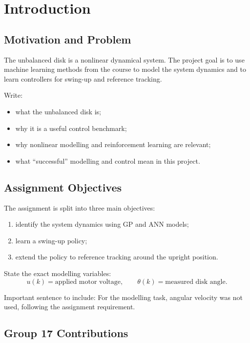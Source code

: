 \documentclass[conference]{IEEEtran}
\begin{document}
\section{Introduction}

\subsection{Motivation and Problem}
The unbalanced disk is a nonlinear dynamical system.
The project goal is to use machine learning methods from the course to model the system dynamics and to learn controllers for swing-up and reference tracking.

Write:
\begin{itemize}
    \item what the unbalanced disk is;
    \item why it is a useful control benchmark;
    \item why nonlinear modelling and reinforcement learning are relevant;
    \item what ``successful'' modelling and control mean in this project.
\end{itemize}

\subsection{Assignment Objectives}
The assignment is split into three main objectives:
\begin{enumerate}
    \item identify the system dynamics using GP and ANN models;
    \item learn a swing-up policy;
    \item extend the policy to reference tracking around the upright position.
\end{enumerate}

State the exact modelling variables:
\begin{equation}
u(k) = \text{applied motor voltage}, \qquad
\theta(k) = \text{measured disk angle}.
\end{equation}

Important sentence to include:
For the modelling task, angular velocity was not used, following the assignment requirement.

\subsection{Group 17 Contributions}
\end{document}
